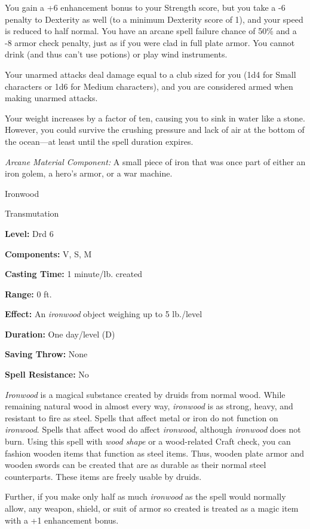 \documentclass{article}
\begin{document}
You gain a +6 enhancement bonus to your Strength score, but you take a -6 penalty 
to Dexterity as well (to a minimum Dexterity score of 1), and your speed is reduced 
to half normal. You have an arcane spell failure chance of 50\% and a -8 armor 
check penalty, just as if you were clad in full plate armor. You cannot drink (and 
thus can't use potions) or play wind instruments.

Your unarmed attacks deal damage equal to a club sized for you (1d4 for Small characters 
or 1d6 for Medium characters), and you are considered armed when making unarmed 
attacks.

Your weight increases by a factor of ten, causing you to sink in water like a stone. 
However, you could survive the crushing pressure and lack of air at the bottom 
of the ocean---at least until the spell duration expires.

\textit{Arcane Material Component: }A small piece of iron that was once part of 
either an iron golem, a hero's armor, or a war machine.

\vspace{12pt}
Ironwood

Transmutation

\textbf{Level:} Drd 6

\textbf{Components:} V, S, M

\textbf{Casting Time:} 1 minute/lb. created

\textbf{Range:} 0 ft.

\textbf{Effect:} An \textit{ironwood }object weighing up to 5 lb./level

\textbf{Duration:} One day/level (D)

\textbf{Saving Throw:} None

\textbf{Spell Resistance:} No

\textit{Ironwood }is a magical substance created by druids from normal wood. While 
remaining natural wood in almost every way, \textit{ironwood }is as strong, heavy, 
and resistant to fire as steel. Spells that affect metal or iron do not function 
on \textit{ironwood}. Spells that affect wood do affect \textit{ironwood}, although 
\textit{ironwood }does not burn. Using this spell with \textit{wood shape }or a 
wood-related Craft check, you can fashion wooden items that function as steel items. 
Thus, wooden plate armor and wooden swords can be created that are as durable as 
their normal steel counterparts. These items are freely usable by druids.

Further, if you make only half as much \textit{ironwood }as the spell would normally 
allow, any weapon, shield, or suit of armor so created is treated as a magic item 
with a +1 enhancement bonus.
\end{document}

